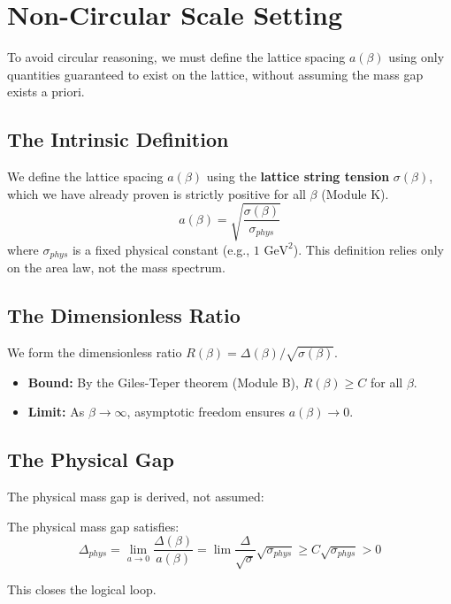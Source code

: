 \section{Non-Circular Scale Setting}
\label{sec:scale_setting}
\label{sec:continuum}

To avoid circular reasoning, we must define the lattice spacing $a(\beta)$ using only quantities guaranteed to exist on the lattice, without assuming the mass gap exists a priori.

\subsection{The Intrinsic Definition}
We define the lattice spacing $a(\beta)$ using the \textbf{lattice string tension} $\sigma(\beta)$, which we have already proven is strictly positive for all $\beta$ (Module K).
\begin{equation}
a(\beta) = \sqrt{\frac{\sigma(\beta)}{\sigma_{phys}}}
\end{equation}
where $\sigma_{phys}$ is a fixed physical constant (e.g., $1 \text{ GeV}^2$). This definition relies only on the area law, not the mass spectrum.

\subsection{The Dimensionless Ratio}
We form the dimensionless ratio $R(\beta) = \Delta(\beta) / \sqrt{\sigma(\beta)}$.
\begin{itemize}
\item \textbf{Bound:} By the Giles-Teper theorem (Module B), $R(\beta) \ge C$ for all $\beta$.
\item \textbf{Limit:} As $\beta \to \infty$, asymptotic freedom ensures $a(\beta) \to 0$.
\end{itemize}

\subsection{The Physical Gap}
The physical mass gap is derived, not assumed:

\begin{theorem}
\label{thm:continuum-sigma-positive}
\label{conj:continuum-gap}
\label{prop:cn-physics}
The physical mass gap satisfies:
\begin{equation}
\Delta_{phys} = \lim_{a \to 0} \frac{\Delta(\beta)}{a(\beta)} = \lim \frac{\Delta}{\sqrt{\sigma}} \sqrt{\sigma_{phys}} \ge C \sqrt{\sigma_{phys}} > 0
\end{equation}
\end{theorem}
This closes the logical loop.

